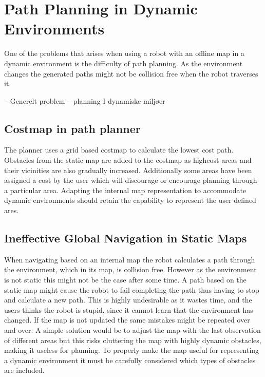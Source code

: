 \section{Path Planning in Dynamic Environments}
One of the problems that arises when using a robot with an  offline map in a dynamic environment is the difficulty of path planning.
As the environment changes the generated paths might not be collision free when the robot traverses it. 


–	Generelt problem – planning I dynamiske miljøer


\subsection{Costmap in path planner}
The planner uses a grid based costmap to calculate the lowest cost path. Obstacles from the static map are added to the costmap as highcost areas and their vicinities are also gradually increased. 
Additionally some areas have been assigned a cost by the user which will discourage or encourage planning through a particular area. 
Adapting the internal map representation to accommodate dynamic environments should retain the capability to represent the user defined ares.  


\subsection{Ineffective Global Navigation in Static Maps}
When navigating based on an internal map the robot calculates a path through the environment, which in its map, is collision free. 
However as the environment is not static this might not be the case after some time. 
A path based on the static map might cause the robot to fail completing the path thus having to stop and calculate a new path. 
This is highly undesirable as it wastes time, and the users thinks the robot is stupid, since it cannot learn that the environment has changed. 
If the map is not updated the same mistakes might be repeated over and over. 
A simple solution would be to adjust the map with the last observation of different areas but this risks cluttering the map with highly dynamic obstacles, making it useless for planning.
To properly make the map useful for representing a dynamic environment it must be carefully considered which types of obstacles are included. 